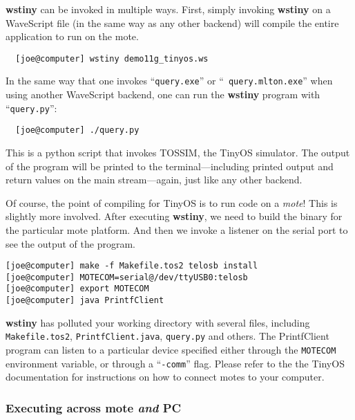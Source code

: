 \documentclass[twocolumn]{report}
\begin{document}
{\bf wstiny} can be invoked in multiple ways.  First, simply invoking
{\bf wstiny} on a WaveScript file (in the same way as any other backend)
will compile the entire application to run on the mote.

\begin{verbatim}
  [joe@computer] wstiny demo11g_tinyos.ws
\end{verbatim}

In the same way that one invokes ``{\tt query.exe}'' or ``{\tt
  query.mlton.exe}'' when using another WaveScript backend, one can
run the {\bf wstiny} program with ``{\tt query.py}'':

\begin{verbatim}
  [joe@computer] ./query.py
\end{verbatim}

This is a python script that invokes TOSSIM, the TinyOS simulator.
The output of the program will be printed to the terminal---including
printed output and return values on the main stream---again, just like
any other backend.

Of course, the point of compiling for TinyOS is to run code on a {\em
  mote}!  This is slightly more involved.  After executing {\bf
  wstiny}, we need to build the binary for the particular mote
platform.  And then we invoke a listener on the serial port to see the
output of the program.

\begin{verbatim}
[joe@computer] make -f Makefile.tos2 telosb install
[joe@computer] MOTECOM=serial@/dev/ttyUSB0:telosb
[joe@computer] export MOTECOM
[joe@computer] java PrintfClient 
\end{verbatim}


{\bf wstiny} has polluted your working directory with several files,
including  {\tt Makefile.tos2}, {\tt PrintfClient.java}, {\tt query.py} and others.
%
The PrintfClient program can listen to a particular device specified
either through the {\tt MOTECOM} environment variable, or through a
``{\tt -comm}'' flag.  Please refer to the the TinyOS documentation
for instructions on how to connect motes to your computer.

\subsubsection*{Executing across mote {\em and} PC}
\end{document}
